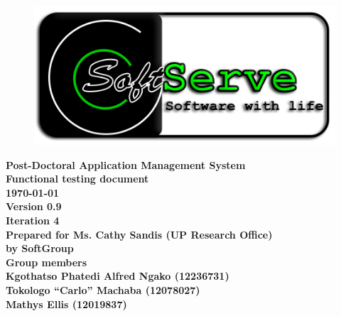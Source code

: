 \documentclass[12pt]{article}
\newcommand{\Title}{Functional testing document} %
\newcommand{\ssr}{Soft\color{green}{Serve }\color{black}}
\newcommand{\version}{0.9}
\newcommand{\iteration}{4}
\newcommand{\client}{Ms. Cathy Sandis (UP Research Office)}
\newcommand{\project}{Post-Doctoral Application Management System}
\begin{document}
\vspace{4em}

\begin{center}%

\begin{figure}[ht!]
\centering
\includegraphics{../Images_Docs/logo.png}
\end{figure}
\LARGE \bf \project \\[1em]
\LARGE \bf \Title \\[0.25em]
\large \bf \today\\
\bf Version \version\\
\bf Iteration \iteration\\[0.5em]
\Large \bf Prepared for \client\\
\Large \bf by
\Large {\bf \ssr Group }\\[0.5em]
\LARGE {\bf Group members}\\[0.25em]
\large
Kgothatso Phatedi Alfred Ngako (12236731) \\[0.5em]
Tokologo “Carlo” Machaba (12078027) \\[0.5em]
Mathys Ellis (12019837) \\[8em]

\end{center}%

\end{document}
